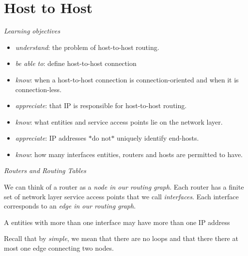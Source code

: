 \section{Host to Host}

\frmrule 

\textit{Learning objectives}

\begin{itemize}[nosep]
\renewcommand{\labelitemi}{$\Box$}
\item \textit{understand}: the problem of host-to-host routing.
\item \textit{be able to}: define host-to-host connection
\item \textit{know}: when a host-to-host connection is connection-oriented and when it is connection-less. 
\item \textit{appreciate}: that IP is responsible for host-to-host routing.
\item \textit{know}: what entities and service access points lie on the network layer.
\item \textit{appreciate}: IP addresses $*$do not$*$ uniquely identify end-hosts.
\item \textit{know}: how many interfaces entities, routers and hosts are permitted to have. 
\end{itemize}

\frmrule




\frmrule

\textit{Routers and Routing Tables}



We can think of a router as a \textit{node in our routing graph}. 
Each router has a finite set of network layer service access points that we 
call \textit{interfaces}.
Each interface corresponds to an \textit{edge in our routing graph}. 

A entities with more than one interface may have more than one IP
address


Recall that by \textit{simple}, we mean that there are no loops 
and that there there at most one edge connecting two nodes.


